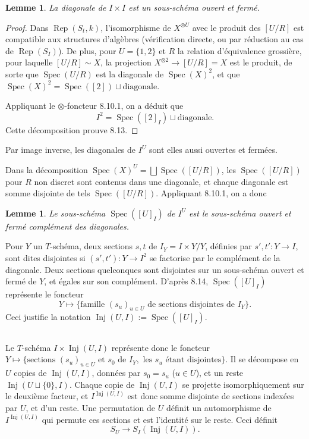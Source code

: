 \documentclass[11pt,a4paper]{article}
\theoremstyle{plain}
\newtheorem{lemma}[theorem]{Lemme}
\theoremstyle{definition}
\DeclareMathOperator{\Spec}{Spec}
\DeclareMathOperator{\Rep}{Rep}
\DeclareMathOperator{\Inj}{Inj}
\begin{document}
\begin{lemma}
La diagonale de $I \times I$ est un sous-sch\'ema ouvert et ferm\'e.
\end{lemma}

\begin{proof}
Dans $\Rep(S_t, k)$, l'isomorphisme de $X^{\otimes U}$ avec le produit des $[U/R]$ est compatible aux structures d'alg\`ebres (v\'erification directe, ou par r\'eduction au cas de $\Rep(S_I)$). De plus, pour $U = \{1, 2\}$ et $R$ la relation d'\'equivalence grossi\`ere, pour laquelle $[U/R] \sim X$, la projection $X^{\otimes 2} \to [U/R] = X$ est le produit, de sorte que $\Spec(U/R)$ est la diagonale de $\Spec(X)^2$, et que $\Spec(X)^2 = \Spec([2]) \sqcup \text{diagonale}$.

Appliquant le $\otimes$-foncteur 8.10.1, on a d\'eduit que
\[
I^2 = \Spec([2]_I) \sqcup \text{diagonale}.
\]
Cette d\'ecomposition prouve 8.13.
\end{proof}

Par image inverse, les diagonales de $I^U$ sont elles aussi ouvertes et ferm\'ees.

Dans la d\'ecomposition $\Spec(X)^U = \bigsqcup \Spec([U/R])$, les $\Spec([U/R])$ pour $R$ non discret sont contenus dans une diagonale, et chaque diagonale est somme disjointe de tels $\Spec([U/R])$. Appliquant 8.10.1, on a donc

\begin{lemma}
Le sous-sch\'ema $\Spec([U]_I)$ de $I^U$ est le sous-sch\'ema ouvert et ferm\'e compl\'ement des diagonales.
\end{lemma}

Pour $Y$ un $T$-sch\'ema, deux sections $s, t$ de $I_Y = I \times Y / Y$, d\'efinies par $s', t' : Y \to I$, sont dites disjointes si $(s', t') : Y \to I^2$ se factorise par le compl\'ement de la diagonale. Deux sections quelconques sont disjointes sur un sous-sch\'ema ouvert et ferm\'e de $Y$, et \'egales sur son compl\'ement. D'apr\`es 8.14, $\Spec([U]_I)$ repr\'esente le foncteur
\[
Y \longmapsto \{\text{famille } (s_u)_{u \in U} \text{ de sections disjointes de } I_Y\}.
\]
Ceci justifie la notation $\Inj(U, I) := \Spec([U]_I)$.

\subsection{}
Le $T$-sch\'ema $I \times \Inj(U, I)$ repr\'esente donc le foncteur $Y \mapsto \{\text{sections } (s_u)_{u \in U} \text{ et } s_0 \text{ de } I_Y, \text{ les } s_u \text{ \'etant disjointes}\}$. Il se d\'ecompose en $U$ copies de $\Inj(U, I)$, donn\'ees par $s_0 = s_u$ ($u \in U$), et un reste $\Inj(U \sqcup \{0\}, I)$. Chaque copie de $\Inj(U, I)$ se projette isomorphiquement sur le deuxi\`eme facteur, et $I^{\Inj(U, I)}$ est donc somme disjointe de sections index\'ees par $U$, et d'un reste. Une permutation de $U$ d\'efinit un automorphisme de $I^{\Inj(U, I)}$ qui permute ces sections et est l'identit\'e sur le reste. Ceci d\'efinit
\begin{equation}
S_U \to S_I(\Inj(U, I)). \tag{8.15.1}
\end{equation}
\end{document}
